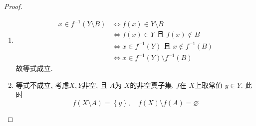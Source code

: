 \documentclass[../main.tex]{subfiles}
\begin{document}
\begin{proof}
    \begin{enumerate}
        \item[(i)]  \[
        \begin{aligned}
        x\in f^{-1} \left( Y\setminus B \right)&\iff f\left( x \right)\in Y\setminus B\\ 
         &\iff    f\left( x \right)\in Y \text{ 且 } f\left( x \right)\not \in B\\ 
          &\iff  x \in f^{-1} \left( Y \right)\text{ 且 } x\not \in f^{-1} \left( B \right)\\ 
           &\iff x \in f^{-1} \left( Y \right)\setminus f^{-1} \left( B \right)      
        \end{aligned}
        \]故等式成立.
        \item[(ii)]等式不成立, 考虑\(  X,Y  \)非空, 且 \(  A  \)为 \(  X  \)的非空真子集.    \(  f  \)在 \(  X  \)上取常值 \(  y \in Y  \).   此时 \[
        f\left( X\setminus A \right)= \left\{ y \right\},\quad f\left( X \right)\setminus f\left( A \right)= \varnothing   
        \]
    \end{enumerate}
    
\end{proof}
\end{document}
